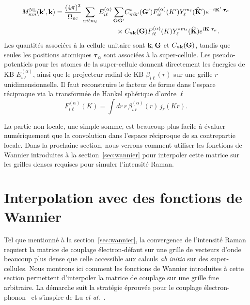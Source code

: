 \begin{equation}
\begin{aligned}
    M_{mn}^\text{NL}(\mathbf{k}',\mathbf{k}) = \frac{(4\pi)^2}{\Omega_\text{uc}}\sum_{\alpha i\ell m_\ell}E_{i\ell}^{(\alpha)}\sum_{\mathbf{G}\mathbf{G}'}
    &C_{m\mathbf{k}'}^*(\mathbf{G}')F_{i\ell}^{(\alpha)}(K')Y_{\ell}^{m_\ell}(\widehat{\mathbf{K}}')e^{-i\mathbf{K}'\cdot\bm{\tau}_{\alpha}}\\
    \times\;&C_{n\mathbf{k}}(\mathbf{G})F_{i\ell}^{(\alpha)}(K)Y_\ell^{*m_\ell}(\widehat{\mathbf{K}})e^{i\mathbf{K}\cdot\bm{\tau}_\alpha}.\label{eqn:MNL_final}
\end{aligned}
\end{equation}
Les quantités associées à la cellule unitaire sont $\mathbf{k}, \mathbf{G}$ et $C_{n\mathbf{k}}(\mathbf{G})$, tandis que seules les positions atomiques $\bm{\tau}_\alpha$ sont associées à la super-cellule. Les pseudo-potentiels pour les atomes de la super-cellule donnent directement les énergies de KB $E_{i\ell}^{(\alpha)}$, ainsi que le projecteur radial de KB $\beta_{i\ell}(r)$ sur une grille $r$ unidimensionnelle. Il faut reconstruire le facteur de forme dans l'espace réciproque via la transformée de Hankel sphérique d'ordre $\ell$
\begin{equation}
    F_{i\ell}^{(\alpha)}(K)=\int dr\,r\,\beta_{i\ell}^{(\alpha)}(r)\,j_\ell(Kr).\label{eqn:Hankel_sphérique}
\end{equation}

La partie non locale, une simple somme, est beaucoup plus facile à évaluer numériquement que la convolution dans l'espace réciproque de sa contrepartie locale. Dans la prochaine section, nous verrons comment utiliser les fonctions de Wannier introduites à la section~\ref{sec:wannier} pour interpoler cette matrice sur les grilles denses requises pour simuler l'intensité Raman.

\section{Interpolation avec des fonctions de Wannier}\label{sec:interp_wannier_M}

Tel que mentionné à la section~\ref{sec:wannier}, la convergence de
l'intensité Raman requiert la matrice de couplage électron-défaut sur une
grille de vecteurs d'onde beaucoup plus dense que celle accessible aux
calculs \textit{ab initio} sur des super-cellules. Nous montrons ici comment les
fonctions de Wannier introduites à cette section permettent d'interpoler
la matrice de couplage sur une grille fine arbitraire. La démarche suit
la stratégie éprouvée pour le couplage électron-phonon~\cite{giustinoElectronphononInteractionUsing2007} et s'inspire de Lu \textit{et al.}~\cite{luInitioElectrondefectInteractions2020}.

